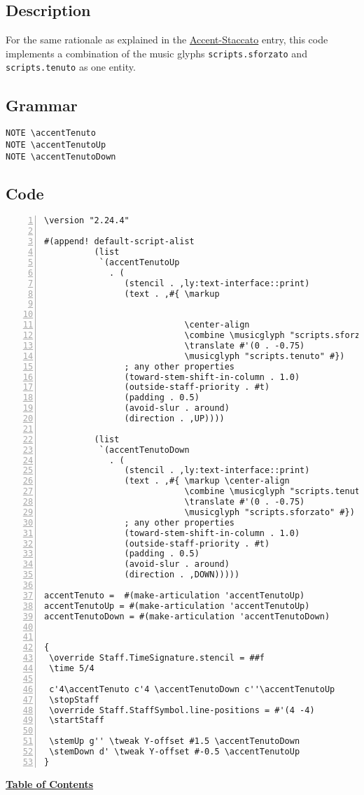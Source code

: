 \subsection{Description}
For the same rationale as explained in the \hyperref[sec:articulations_accent-staccato]{Accent-Staccato} entry, this code implements a combination of the music glyphs \verb|scripts.sforzato| and \verb|scripts.tenuto| as one entity.

\subsection{Grammar}
\begin{verbatim}
NOTE \accentTenuto
NOTE \accentTenutoUp
NOTE \accentTenutoDown
\end{verbatim}
\subsection{Code}
\begin{Verbatim}[numbers=left,xleftmargin=5mm]
\version "2.24.4"

#(append! default-script-alist
          (list
           `(accentTenutoUp
             . (
                (stencil . ,ly:text-interface::print)
                (text . ,#{ \markup


                            \center-align
                            \combine \musicglyph "scripts.sforzato"
                            \translate #'(0 . -0.75) 
                            \musicglyph "scripts.tenuto" #})
                ; any other properties
                (toward-stem-shift-in-column . 1.0)
                (outside-staff-priority . #t)
                (padding . 0.5)
                (avoid-slur . around)
                (direction . ,UP))))

          (list
           `(accentTenutoDown
             . (
                (stencil . ,ly:text-interface::print)
                (text . ,#{ \markup \center-align
                            \combine \musicglyph "scripts.tenuto"
                            \translate #'(0 . -0.75) 
                            \musicglyph "scripts.sforzato" #})
                ; any other properties
                (toward-stem-shift-in-column . 1.0)
                (outside-staff-priority . #t)
                (padding . 0.5)
                (avoid-slur . around)
                (direction . ,DOWN)))))

accentTenuto =  #(make-articulation 'accentTenutoUp)
accentTenutoUp = #(make-articulation 'accentTenutoUp)
accentTenutoDown = #(make-articulation 'accentTenutoDown)


{
 \override Staff.TimeSignature.stencil = ##f
 \time 5/4

 c'4\accentTenuto c'4 \accentTenutoDown c''\accentTenutoUp
 \stopStaff
 \override Staff.StaffSymbol.line-positions = #'(4 -4)
 \startStaff

 \stemUp g'' \tweak Y-offset #1.5 \accentTenutoDown
 \stemDown d' \tweak Y-offset #-0.5 \accentTenutoUp
}
\end{Verbatim}
\hyperref[sec:toc]{\textbf{Table of Contents}}
\vfill \break

